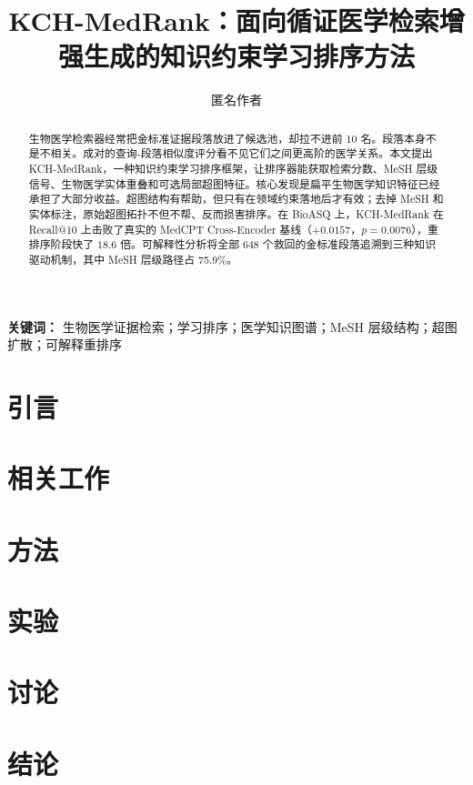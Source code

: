 \documentclass[UTF8,11pt]{ctexart}
\title{KCH-MedRank：面向循证医学检索增强生成的知识约束学习排序方法}
\author{匿名作者}
\date{}
\begin{document}
\maketitle

\begin{abstract}
生物医学检索器经常把金标准证据段落放进了候选池，却拉不进前 10 名。段落本身不是不相关。成对的查询-段落相似度评分看不见它们之间更高阶的医学关系。本文提出 KCH-MedRank，一种知识约束学习排序框架，让排序器能获取检索分数、MeSH 层级信号、生物医学实体重叠和可选局部超图特征。核心发现是扁平生物医学知识特征已经承担了大部分收益。超图结构有帮助，但只有在领域约束落地后才有效；去掉 MeSH 和实体标注，原始超图拓扑不但不帮、反而损害排序。在 BioASQ 上，KCH-MedRank 在 Recall@10 上击败了真实的 MedCPT Cross-Encoder 基线（$+0.0157$，$p=0.0076$），重排序阶段快了 $18.6$ 倍。可解释性分析将全部 648 个救回的金标准段落追溯到三种知识驱动机制，其中 MeSH 层级路径占 75.9\%。
\end{abstract}

\vspace{5pt}
\noindent\textbf{关键词：} 生物医学证据检索；学习排序；医学知识图谱；MeSH 层级结构；超图扩散；可解释重排序

\section{引言}

\section{相关工作}

\section{方法}
\label{sec:method}


\section{实验}




\section{讨论}
\label{sec:discussion}

\section{结论}

\end{document}
